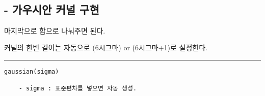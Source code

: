 \documentclass[11pt]{article}
\begin{document}
    \begin{center}
    \end{center}
    { \hspace*{\fill} \\}
    
    \hypertarget{uxac00uxc6b0uxc2dcuxc548-uxcee4uxb110-uxad6cuxd604}{%
\subsection{- 가우시안 커널
구현}\label{uxac00uxc6b0uxc2dcuxc548-uxcee4uxb110-uxad6cuxd604}}

마지막으로 합으로 나눠주면 된다.

커널의 한변 길이는 자동으로 (6시그마) or (6시그마+1)로 설정한다.

\begin{center}\rule{0.5\linewidth}{0.5pt}\end{center}

\begin{verbatim}
gaussian(sigma)

    - sigma : 표준편차를 넣으면 자동 생성.
\end{verbatim}
\end{document}
